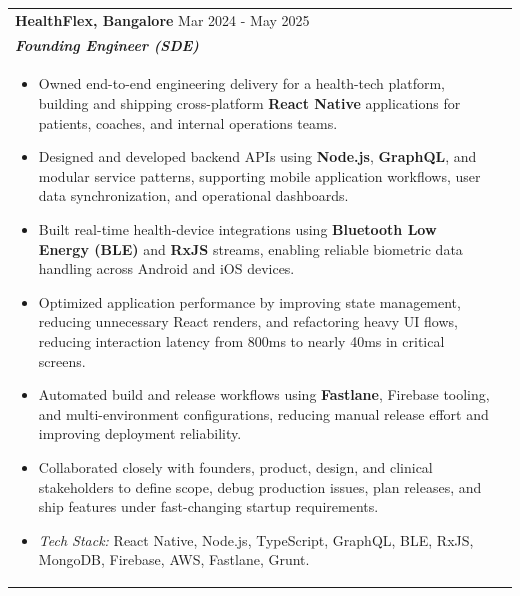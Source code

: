 \documentclass[a4paper,8pt]{article}
\begin{document}
\begin{tabularx}{\linewidth}{ @{}l r@{} }
\color[HTML]{1C033C} \textbf{{HealthFlex, Bangalore}} \hfill \color[HTML]{371e77} Mar 2024 - May 2025 \\[4pt]
\color[HTML]{371e77}\textbf{\textit{Founding Engineer (SDE)}}\ \hfill \color[HTML]{4B28A4} \\[5pt]
\begin{minipage}[t]{\linewidth}
    \begin{itemize}[nosep,after=\strut, leftmargin=2em, itemsep=2pt]
        \item Owned end-to-end engineering delivery for a health-tech platform, building and shipping cross-platform \textbf{React Native} applications for patients, coaches, and internal operations teams.
        \item Designed and developed backend APIs using \textbf{Node.js}, \textbf{GraphQL}, and modular service patterns, supporting mobile application workflows, user data synchronization, and operational dashboards.
        \item Built real-time health-device integrations using \textbf{Bluetooth Low Energy (BLE)} and \textbf{RxJS} streams, enabling reliable biometric data handling across Android and iOS devices.
        \item Optimized application performance by improving state management, reducing unnecessary React renders, and refactoring heavy UI flows, reducing interaction latency from 800ms to nearly 40ms in critical screens.
        \item Automated build and release workflows using \textbf{Fastlane}, Firebase tooling, and multi-environment configurations, reducing manual release effort and improving deployment reliability.
        \item Collaborated closely with founders, product, design, and clinical stakeholders to define scope, debug production issues, plan releases, and ship features under fast-changing startup requirements.
        \item \textit{Tech Stack:} React Native, Node.js, TypeScript, GraphQL, BLE, RxJS, MongoDB, Firebase, AWS, Fastlane, Grunt.
    \end{itemize}
\end{minipage}
\end{tabularx}
\end{document}
